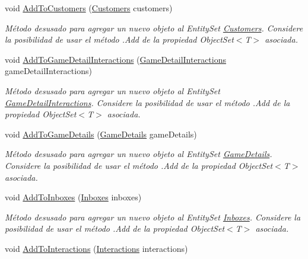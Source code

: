 \begin{DoxyCompactItemize}
void \hyperlink{class_game_memory_1_1_o_m_k_t_d_b_entities_ac35584f2d5718386fb999d2215ee4e7d}{Add\-To\-Customers} (\hyperlink{class_game_memory_1_1_customers}{Customers} customers)
\begin{DoxyCompactList}\small\item\em Método desusado para agregar un nuevo objeto al Entity\-Set \hyperlink{class_game_memory_1_1_customers}{Customers}. Considere la posibilidad de usar el método .Add de la propiedad Object\-Set$<$T$>$ asociada. \end{DoxyCompactList}\item 
void \hyperlink{class_game_memory_1_1_o_m_k_t_d_b_entities_abd0a178b54323dd14425c06ed4ae002f}{Add\-To\-Game\-Detail\-Interactions} (\hyperlink{class_game_memory_1_1_game_detail_interactions}{Game\-Detail\-Interactions} game\-Detail\-Interactions)
\begin{DoxyCompactList}\small\item\em Método desusado para agregar un nuevo objeto al Entity\-Set \hyperlink{class_game_memory_1_1_game_detail_interactions}{Game\-Detail\-Interactions}. Considere la posibilidad de usar el método .Add de la propiedad Object\-Set$<$T$>$ asociada. \end{DoxyCompactList}\item 
void \hyperlink{class_game_memory_1_1_o_m_k_t_d_b_entities_a0e4422cc4f67163ef8d56970b295dd45}{Add\-To\-Game\-Details} (\hyperlink{class_game_memory_1_1_game_details}{Game\-Details} game\-Details)
\begin{DoxyCompactList}\small\item\em Método desusado para agregar un nuevo objeto al Entity\-Set \hyperlink{class_game_memory_1_1_game_details}{Game\-Details}. Considere la posibilidad de usar el método .Add de la propiedad Object\-Set$<$T$>$ asociada. \end{DoxyCompactList}\item 
void \hyperlink{class_game_memory_1_1_o_m_k_t_d_b_entities_aa77570b2e4a8cfb400959bd8045a6264}{Add\-To\-Inboxes} (\hyperlink{class_game_memory_1_1_inboxes}{Inboxes} inboxes)
\begin{DoxyCompactList}\small\item\em Método desusado para agregar un nuevo objeto al Entity\-Set \hyperlink{class_game_memory_1_1_inboxes}{Inboxes}. Considere la posibilidad de usar el método .Add de la propiedad Object\-Set$<$T$>$ asociada. \end{DoxyCompactList}\item 
void \hyperlink{class_game_memory_1_1_o_m_k_t_d_b_entities_ace4f60560edc5ffa1f4cb00adfcbd2da}{Add\-To\-Interactions} (\hyperlink{class_game_memory_1_1_interactions}{Interactions} interactions)

\end{DoxyCompactItemize}
